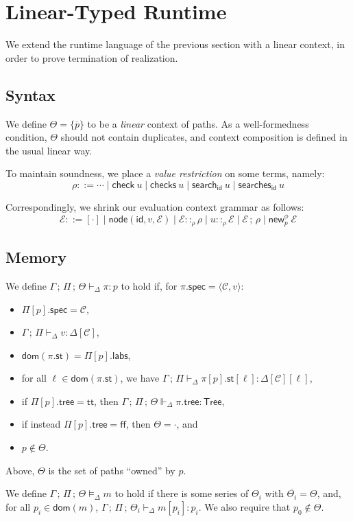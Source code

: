 \documentclass{article}
\newcommand{\num}[1]{\overline{#1}}
\newcommand{\mf}[1]{\mathsf{#1}}
\newcommand{\mc}[1]{\mathcal{#1}}
\newcommand{\semi}{\,;\,}
\newcommand{\dom}{\mf{dom}}
\newcommand{\pair}[2]{\langle #1, #2 \rangle}
\newcommand{\tval}[4]{#1 \semi #2 \vdash_\Delta #3 : #4}
\newcommand{\tpi}[5]{#1 \semi #2 \semi #3 \vdash_\Delta #4: #5}
\newcommand{\tmeml}[4]{#1 \semi #2 \semi #3 \vDash_\Delta #4}
\newcommand{\trhol}[5]{#1 \semi #2 \semi #3 \Vdash_\Delta #4: #5}
\newcommand{\ttree}{\mf{Tree}}
\renewcommand{\tt}{\mf{tt}}
\newcommand{\ff}{\mf{ff}}
\newcommand{\C}{\mc{C}}
\newcommand{\E}{\mc{E}}
\newcommand{\enode}[3]{\mf{node}(\mf{#1}, #2, #3)}
\newcommand{\esearch}[2]{\mf{search}_\mf{#1}\ #2}
\newcommand{\esearches}[2]{\mf{searches}_\mf{#1}\ #2}
\newcommand{\enew}[3]{\mf{new}^{#1}_{#2}\ #3}
\newcommand{\echk}[1]{\mf{check}\ #1}
\newcommand{\echks}[1]{\mf{checks}\ #1}
\begin{document}
\pagebreak

\section{Linear-Typed Runtime}

We extend the runtime language of the previous section
with a linear context, in order to prove termination of realization.

\subsection{Syntax}

We define $\Theta=\{\num{p}\}$ to be a \emph{linear} context
of paths. As a well-formedness condition,
$\Theta$ should not contain duplicates, and 
context composition is defined in the usual linear way.

To maintain soundness, we place a \emph{value restriction}
on some terms, namely:
$$\rho ::= \cdots \mid \echk{u} \mid \echks{u} \mid \esearch{id}{u}
\mid \esearches{id}{u}$$

Correspondingly, we shrink our evaluation context grammar as follows:
$$\E ::= [\cdot] \mid \enode{id}{v}{\E} \mid \E ::_\rho \rho
\mid u ::_\rho \E \mid \E \semi \rho \mid \enew{\phi}{p}{\E}$$

\subsection{Memory}

We define $\tpi{\Gamma}{\Pi}{\Theta}{\pi}{p}$ to hold if,
for $\pi.\mf{spec}=\pair{\C}{v}$:
\begin{itemize}
\item $\Pi[p].\mf{spec}=\C$,
\item $\tval{\Gamma}{\Pi}{v}{\Delta[\C]}$,
\item $\dom(\pi.\mf{st}) = \Pi[p].\mf{labs}$,
\item for all $\ell \in \dom(\pi.\mf{st})$,
we have $\tval{\Gamma}{\Pi}{\pi[p].\mf{st}[\ell]}{\Delta[\C][\ell]}$,
\item if $\Pi[p].\mf{tree} = \tt$, then
$\trhol{\Gamma}{\Pi}{\Theta}{\pi.\mf{tree}}{\ttree}$,
\item if instead $\Pi[p].\mf{tree} = \ff$, then $\Theta=\cdot$, and
\item $p \notin \Theta$.
\end{itemize}
Above, $\Theta$ is the set of paths ``owned'' by $p$.

We define $\tmeml{\Gamma}{\Pi}{\Theta}{m}$ to hold if
there is some series of $\Theta_i$ with $\num{\Theta_i}=\Theta$,
and, for all $p_i \in \dom(m)$,
$\tpi{\Gamma}{\Pi}{\Theta_i}{m[p_i]}{p_i}$.
We also require that $p_0 \notin \Theta$.
\end{document}

